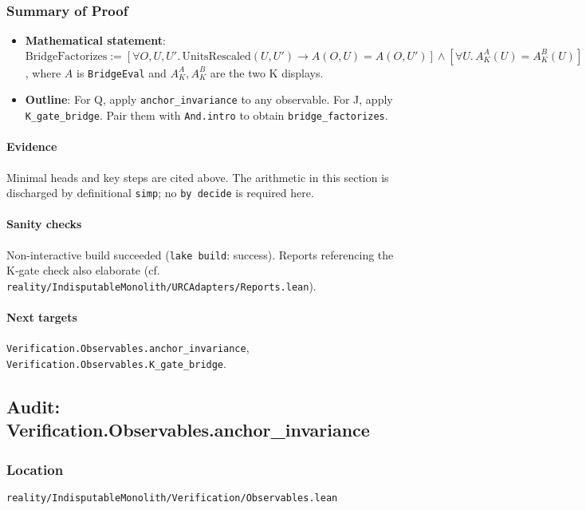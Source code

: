 \documentclass{article}
\newcommand{\FileRef}[1]{\texttt{#1}}
\begin{document}
\subsubsection{Summary of Proof}
\begin{itemize}[leftmargin=*]
  \item \textbf{Mathematical statement}: \(\mathrm{BridgeFactorizes} := [\forall O,U,U'.\,\mathrm{UnitsRescaled}(U,U')\to A(O,U)=A(O,U')] \land [\forall U.\, A_K^A(U)=A_K^B(U)]\), where \(A\) is \texttt{BridgeEval} and \(A_K^A, A_K^B\) are the two K displays.
  \item \textbf{Outline}: For Q, apply \texttt{anchor\_invariance} to any observable. For J, apply \texttt{K\_gate\_bridge}. Pair them with \texttt{And.intro} to obtain \texttt{bridge\_factorizes}.
\end{itemize}

\paragraph{Evidence}
Minimal heads and key steps are cited above. The arithmetic in this section is discharged by definitional \texttt{simp}; no \texttt{by decide} is required here.

\paragraph{Sanity checks}
Non-interactive build succeeded (\texttt{lake build}: success). Reports referencing the K‑gate check also elaborate (cf. \FileRef{reality/IndisputableMonolith/URCAdapters/Reports.lean}).

\paragraph{Next targets} \texttt{Verification.Observables.anchor\_invariance}, \texttt{Verification.Observables.K\_gate\_bridge}.

\subsection{Audit: Verification.Observables.anchor\_invariance}
\subsubsection{Location}
\FileRef{reality/IndisputableMonolith/Verification/Observables.lean}
\end{document}
